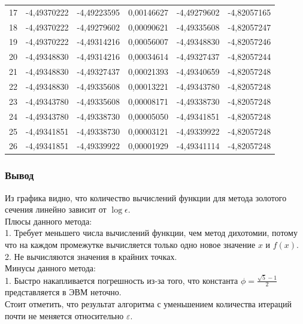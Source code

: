 \begin{center}
\begin{tabular}{ | l | l | l | l | l | l |}
        17            & -4,49370222 & -4,49223595 & 0,00146627 & -4,49279602 & -4,82057165 \\
        18            & -4,49370222 & -4,49279602 & 0,00090621 & -4,49335608 & -4,82057247 \\
        19            & -4,49370222 & -4,49314216 & 0,00056007 & -4,49348830 & -4,82057246 \\
        20            & -4,49348830 & -4,49314216 & 0,00034614 & -4,49327437 & -4,82057244 \\
        21            & -4,49348830 & -4,49327437 & 0,00021393 & -4,49340659 & -4,82057248 \\
        22            & -4,49348830 & -4,49335608 & 0,00013221 & -4,49343780 & -4,82057248 \\
        23            & -4,49343780 & -4,49335608 & 0,00008171 & -4,49338730 & -4,82057248 \\
        24            & -4,49343780 & -4,49338730 & 0,00005050 & -4,49341851 & -4,82057248 \\
        25            & -4,49341851 & -4,49338730 & 0,00003121 & -4,49339922 & -4,82057248 \\
        26            & -4,49341851 & -4,49339922 & 0,00001929 & -4,49341114 & -4,82057248 \\ \hline
    \end{tabular}
\end{center}

\subsubsection{Вывод}
{Из графика  видно, что количество вычислений функции для метода золотого сечения линейно зависит от $\log\epsilon$. \\

Плюсы данного метода: \\
1. Требует меньшего числа вычислений функции, чем метод дихотомии, потому что на каждом промежутке вычисляется только одно новое значение $x$ и $f(x)$. \\
2. Не вычисляются значения в крайних точках. \\

Минусы данного метода: \\
1. Быстро накапливается погрешность из-за того, что константа $\phi=\frac{\sqrt{5}-1}{2}$ представляется в ЭВМ неточно. \\

Стоит отметить, что результат алгоритма с уменьшением количества итераций почти не меняется относительно $\varepsilon$.}
\newpage


